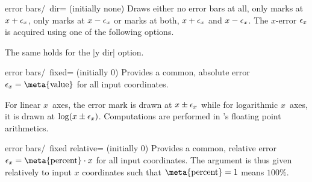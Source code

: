 {\begin{codeexample}[]
\end{codeexample}

\begin{codeexample}[]
\end{codeexample}

\begin{pgfplotsxykey}{error bars/\x\ dir= (initially none)}
Draws either no error bars at all, only marks at $x+\epsilon_{x}$, only marks at $x-\epsilon_{x}$ or marks at both, $x+\epsilon_{x}$ and $x-\epsilon_{x}$. The $x$-error $\epsilon_{x}$ is acquired using one of the following options.

The same holds for the |y dir| option.
\end{pgfplotsxykey}

\begin{pgfplotsxykey}{error bars/\x\ fixed= (initially 0)}
Provides a common, absolute error $\pgfplotserror x=\text{\meta{value}}$ for all input coordinates.

For linear $x$~axes, the error mark is drawn at $x \pm \epsilon_{x}$ while for logarithmic $x$~axes, it is drawn at $\log( x \pm \epsilon_{x})$. Computations are performed in \PGF's floating point arithmetics.
\end{pgfplotsxykey}

\begin{pgfplotsxykey}{error bars/\x\ fixed relative= (initially 0)}
Provides a common, relative error $\pgfplotserror x = \text{\meta{percent}} \cdot x$ for all input coordinates. The argument  is thus given relatively to input $x$ coordinates such that $\text{\meta{percent}} = 1$ means $100\%$.


\end{pgfplotsxykey}}
